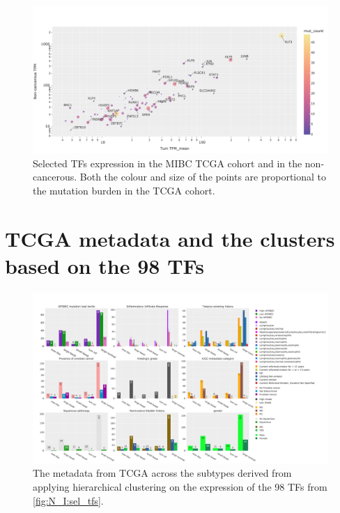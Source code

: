 \begin{figure}[!htb]   
\centering
\includegraphics[width=1.0\textwidth,height=1.0\textheight,keepaspectratio]{Sections/Network_I/Resources/selective_pruning/sel_tfs/sel_tfs_mean_tum_healthy.png}
  \caption{Selected TFs expression in the MIBC TCGA cohort and in the non-cancerous. Both the colour and size of the points are proportional to the mutation burden in the TCGA cohort.}
\label{fig:ap:sel_tfs_mean}
\end{figure}


\section{TCGA metadata and the clusters based on the 98 TFs} \label{s:ap:sel_prun_tcga_meta}


\begin{figure}[!htb]   
    \centering
    \includegraphics[width=1.0\textwidth,keepaspectratio]{Sections/Network_I/Resources/selective_pruning/sel_tfs/sel_tfs_tcga_meta.png}
      \caption{The metadata from TCGA \cite{Robertson2017-mg} across the subtypes derived from applying hierarchical clustering on the expression of the 98 TFs from \cref{fig:N_I:sel_tfs}. }
    \label{fig:ap:sel_tfs_tcga_metadata}
\end{figure}


